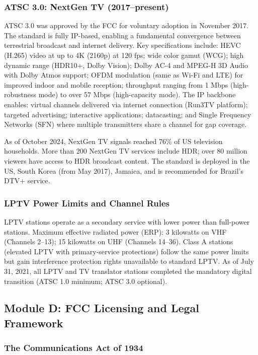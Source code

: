 \documentclass[11pt,letterpaper]{article}
\begin{document}
\subsubsection{ATSC 3.0: NextGen TV (2017--present)}

ATSC 3.0 was approved by the FCC for voluntary adoption in November 2017. The standard is fully IP-based, enabling a fundamental convergence between terrestrial broadcast and internet delivery. Key specifications include: HEVC (H.265) video at up to 4K (2160p) at 120 fps; wide color gamut (WCG); high dynamic range (HDR10+, Dolby Vision); Dolby AC-4 and MPEG-H 3D Audio with Dolby Atmos support; OFDM modulation (same as Wi-Fi and LTE) for improved indoor and mobile reception; throughput ranging from 1 Mbps (high-robustness mode) to over 57 Mbps (high-capacity mode). The IP backbone enables: virtual channels delivered via internet connection (Run3TV platform); targeted advertising; interactive applications; datacasting; and Single Frequency Networks (SFN) where multiple transmitters share a channel for gap coverage.

As of October 2024, NextGen TV signals reached 76\% of US television households. More than 200 NextGen TV services include HDR; over 80 million viewers have access to HDR broadcast content. The standard is deployed in the US, South Korea (from May 2017), Jamaica, and is recommended for Brazil's DTV+ service.

\subsubsection{LPTV Power Limits and Channel Rules}

LPTV stations operate as a secondary service with lower power than full-power stations. Maximum effective radiated power (ERP): 3 kilowatts on VHF (Channels 2--13); 15 kilowatts on UHF (Channels 14--36). Class A stations (elevated LPTV with primary-service protections) follow the same power limits but gain interference protection rights unavailable to standard LPTV. As of July 31, 2021, all LPTV and TV translator stations completed the mandatory digital transition (ATSC 1.0 minimum; ATSC 3.0 optional).

\subsection{Module D: FCC Licensing and Legal Framework}

\subsubsection{The Communications Act of 1934}
\end{document}
